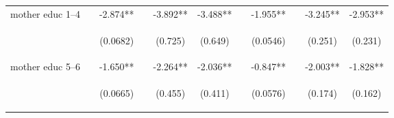 \documentclass{article}[11pt,subeqn]
\begin{document}
\begin{spacing}{1.5}
\begin{sidewaystable}[!htbp]
\begin{center}
\begin{tabular}{lcccccccccc}
mother educ 1--4	&		&	-2.874**	&		&	-3.892**	&	-3.488**	&		&	-1.955**	&		&	-3.245**	&	-2.953**	\\
\vspace{4pt} & \begin{footnotesize}			\end{footnotesize} & \begin{footnotesize}	(0.0682)	\end{footnotesize} & \begin{footnotesize}		\end{footnotesize} & \begin{footnotesize}	(0.725)	\end{footnotesize} & \begin{footnotesize}	(0.649)	\end{footnotesize} & \begin{footnotesize}		\end{footnotesize} & \begin{footnotesize}	(0.0546)	\end{footnotesize} & \begin{footnotesize}		\end{footnotesize} & \begin{footnotesize}	(0.251)	\end{footnotesize} & \begin{footnotesize}	(0.231)	\end{footnotesize} \\
mother educ 5--6	&		&	-1.650**	&		&	-2.264**	&	-2.036**	&		&	-0.847**	&		&	-2.003**	&	-1.828**	\\
\vspace{4pt} & \begin{footnotesize}			\end{footnotesize} & \begin{footnotesize}	(0.0665)	\end{footnotesize} & \begin{footnotesize}		\end{footnotesize} & \begin{footnotesize}	(0.455)	\end{footnotesize} & \begin{footnotesize}	(0.411)	\end{footnotesize} & \begin{footnotesize}		\end{footnotesize} & \begin{footnotesize}	(0.0576)	\end{footnotesize} & \begin{footnotesize}		\end{footnotesize} & \begin{footnotesize}	(0.174)	\end{footnotesize} & \begin{footnotesize}	(0.162)	\end{footnotesize} \\

\end{tabular}
\end{center}
\end{sidewaystable}
\end{spacing}
\end{document}
